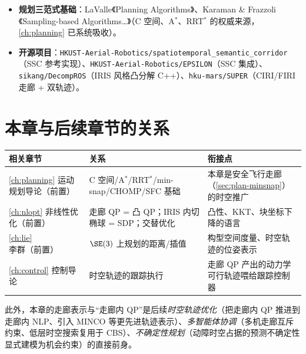 \begin{itemize}
  \item \textbf{规划三范式基础}：LaValle《Planning Algorithms》\cite{lavalle2006planning}、Karaman \& Frazzoli《Sampling-based Algorithms\dots》\cite{karaman2011sampling}（C 空间、A$^*$、RRT$^*$ 的权威来源，\cref{ch:planning} 已系统吸收）。
  \item \textbf{开源项目}：\texttt{HKUST-Aerial-Robotics/\allowbreak spatiotemporal\_semantic\_corridor}（SSC 参考实现）、\texttt{HKUST-Aerial-Robotics/\allowbreak EPSILON}（SSC 集成）、\texttt{sikang/\allowbreak DecompROS}（IRIS 风格凸分解 C++）、\texttt{hku-mars/\allowbreak SUPER}（CIRI/FIRI 走廊 + 双轨迹）。
\end{itemize}

\section*{本章与后续章节的关系}
\begin{table}[H]\centering\small
\begin{tabularx}{\linewidth}{LLL}
\toprule
相关章节 & 关系 & 衔接点 \\
\midrule
\cref{ch:planning} 运动规划导论（前置） & C 空间/A$^*$/RRT$^*$/min-snap/CHOMP/SFC 基础 & 本章是安全飞行走廊（\cref{sec:plan-minsnap}）的时空推广 \\
\cref{ch:nlopt} 非线性优化（前置） & 走廊 QP = 凸 QP；IRIS 内切椭球 = SDP；交替优化 & 凸性、KKT、块坐标下降的语言 \\
\cref{ch:lie} 李群（前置） & $\SE(3)$ 上规划的距离/插值 & 构型空间度量、时空轨迹的位姿表示 \\
\cref{ch:control} 控制导论 & 时空轨迹的跟踪执行 & 走廊 QP 产出的动力学可行轨迹喂给跟踪控制器 \\
\bottomrule
\end{tabularx}
\end{table}
\noindent{}此外，本章的走廊表示与“走廊内 QP”是后续\emph{时空轨迹优化}（把走廊内 QP 推进到走廊内 NLP、引入 MINCO 等更先进轨迹表示）、\emph{多智能体协调}（多机走廊互斥约束、低层时空搜索复用于 CBS）、\emph{不确定性规划}（动障时空占据的预测不确定性显式建模为机会约束）的直接前身。

